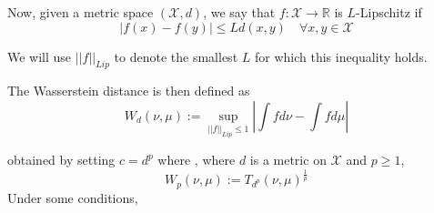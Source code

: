\documentclass[10pt]{article}
\theoremstyle{definition}
\begin{document}
Now, given a metric space $(\mathcal X, d)$, we say that $f: \mathcal X \rightarrow \mathbb R$
is $L$-Lipschitz if
\begin{equation}
	\mid f(x) - f(y) \mid \leq L d(x,y) \quad \forall x,y \in \mathcal X
\end{equation}

We will use $||f||_{Lip}$ to denote the smallest $L$ for which this inequality holds.

The Wasserstein distance is then defined as 
$$
W_d(\nu, \mu) := \sup_{||f||_{Lip}\leq 1} \left |
\int f d\nu - \int f d\mu	
\right |
$$


obtained by setting $c = d^p$ where , where $d$ is a metric
on $\mathcal X$ and $p \geq 1$,
$$
W_p(\nu,\mu):= T_{d^p}(\nu,\mu)^{\frac{1}{p}}
$$
Under some conditions, 




  
  
\end{document}
